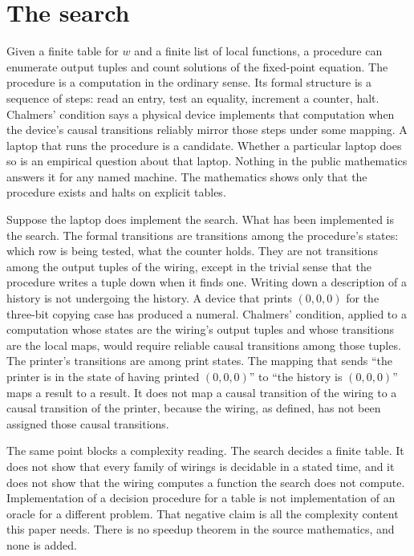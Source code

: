 \documentclass[11pt]{article}
\begin{document}
\section{The search}
\label{sec:search}

Given a finite table for \(w\) and a finite list of local functions, a procedure can enumerate output tuples and count solutions of the fixed-point equation. The procedure is a computation in the ordinary sense. Its formal structure is a sequence of steps: read an entry, test an equality, increment a counter, halt. Chalmers' condition says a physical device implements that computation when the device's causal transitions reliably mirror those steps under some mapping. A laptop that runs the procedure is a candidate. Whether a particular laptop does so is an empirical question about that laptop. Nothing in the public mathematics answers it for any named machine. The mathematics shows only that the procedure exists and halts on explicit tables.

Suppose the laptop does implement the search. What has been implemented is the search. The formal transitions are transitions among the procedure's states: which row is being tested, what the counter holds. They are not transitions among the output tuples of the wiring, except in the trivial sense that the procedure writes a tuple down when it finds one. Writing down a description of a history is not undergoing the history. A device that prints \((0,0,0)\) for the three-bit copying case has produced a numeral. Chalmers' condition, applied to a computation whose states are the wiring's output tuples and whose transitions are the local maps, would require reliable causal transitions among those tuples. The printer's transitions are among print states. The mapping that sends ``the printer is in the state of having printed \((0,0,0)\)'' to ``the history is \((0,0,0)\)'' maps a result to a result. It does not map a causal transition of the wiring to a causal transition of the printer, because the wiring, as defined, has not been assigned those causal transitions.

The same point blocks a complexity reading. The search decides a finite table. It does not show that every family of wirings is decidable in a stated time, and it does not show that the wiring computes a function the search does not compute. Implementation of a decision procedure for a table is not implementation of an oracle for a different problem. That negative claim is all the complexity content this paper needs. There is no speedup theorem in the source mathematics, and none is added.
\end{document}
